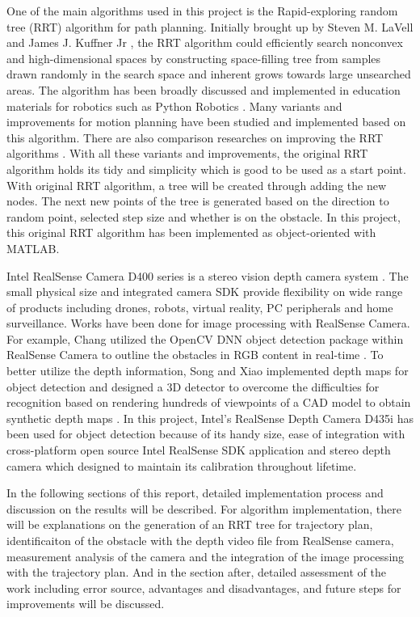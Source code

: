 \documentclass[
  oneside]{ubcthesis}
\begin{document}
One of the main algorithms used in this project is the Rapid-exploring random tree (RRT) algorithm for path planning. Initially brought up by Steven M. LaVell and James J. Kuffner Jr \citep{rrt}, the RRT algorithm could efficiently search nonconvex and high-dimensional spaces by constructing space-filling tree from samples drawn randomly in the search space and inherent grows towards large unsearched areas. The algorithm has been broadly discussed and implemented in education materials for robotics such as Python Robotics \citep{pythonRobotics}. Many variants and improvements for motion planning have been studied and implemented based on this algorithm. There are also comparison researches on improving the RRT algorithms \citep{rrtCompare}. With all these variants and improvements, the original RRT algorithm holds its tidy and simplicity which is good to be used as a start point. With original RRT algorithm, a tree will be created through adding the new nodes. The next new points of the tree is generated based on the direction to random point, selected step size and whether is on the obstacle. In this project, this original RRT algorithm has been implemented as object-oriented with MATLAB.

Intel RealSense Camera D400 series is a stereo vision depth camera system \citep{realSenseD400}. The small physical size and integrated camera SDK provide flexibility on wide range of products including drones, robots, virtual reality, PC peripherals and home surveillance. Works have been done for image processing with RealSense Camera. For example, Chang utilized the OpenCV DNN object detection package within RealSense Camera to outline the obstacles in RGB content in real-time \citep{rscvdnn}. To better utilize the depth information, Song and Xiao implemented depth maps for object detection and designed a 3D detector to overcome the difficulties for recognition based on rendering hundreds of viewpoints of a CAD model to obtain synthetic depth maps \citep{slidingShapes}. In this project, Intel's RealSense Depth Camera D435i has been used for object detection because of its handy size, ease of integration with cross-platform open source Intel RealSense SDK application and stereo depth camera which designed to maintain its calibration throughout lifetime.

In the following sections of this report, detailed implementation process and discussion on the results will be described. For algorithm implementation, there will be explanations on the generation of an RRT tree for trajectory plan, identificaiton of the obstacle with the depth video file from RealSense camera, measurement analysis of the camera and the integration of the image processing with the trajectory plan. And in the section after, detailed assessment of the work including error source, advantages and disadvantages, and future steps for improvements will be discussed.
\end{document}
